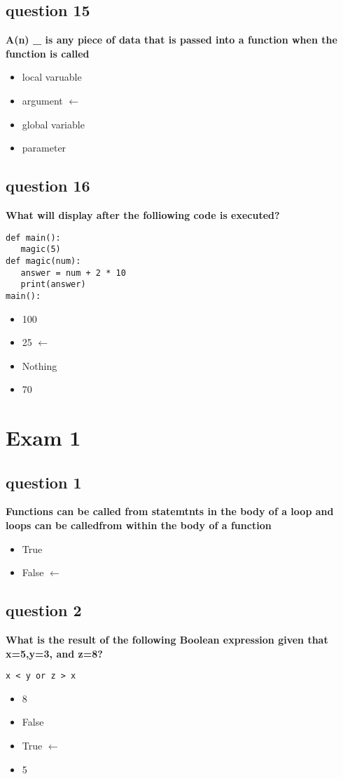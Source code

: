 \documentclass[10pt]{article}
\begin{document}
\subsection*{question 15}
\textbf{A(n) \_ is any piece of data that is passed into a function when the function is called}
\begin{itemize}
\item local varuable 
\item argument $\leftarrow$
\item global variable
\item parameter
\end{itemize}
\subsection*{question 16}
\textbf{What will display after the folliowing code is executed?}
\begin{verbatim}
def main():
   magic(5)
def magic(num):
   answer = num + 2 * 10
   print(answer)
main():
\end{verbatim}
\begin{itemize}
\item 100
\item 25 $\leftarrow$
\item Nothing
\item 70
\end{itemize}
\break
\section*{Exam 1}
\subsection*{question 1}
\textbf{Functions can be called from statemtnts in the body of a loop and loops can be calledfrom within the body of a function}
\begin{itemize}
\item True
\item False $\leftarrow$
\end{itemize}
\subsection*{question 2}
\textbf{What is the result of the following Boolean expression given that x=5,y=3, and z=8?}
\begin{verbatim}
x < y or z > x
\end{verbatim}
\begin{itemize}
\item 8
\item False
\item True $\leftarrow$
\item 5
\end{itemize}
\end{document}
